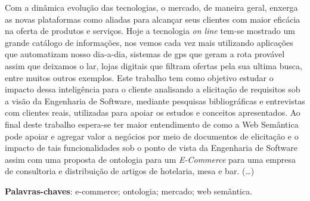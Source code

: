 \begin{resumo}

Com a dinâmica evolução das tecnologias, o mercado, de maneira geral,
 enxerga as novas plataformas como aliadas para alcançar seus clientes com maior
 eficácia na oferta de produtos e serviços. Hoje a tecnologia \textit{on line}
 tem-se mostrado um grande catálogo de informações, nos vemos cada vez
 mais utilizando aplicações que automatizam nosso dia-a-dia, sistemas de gps
 que geram a rota provável assim que deixamos o lar, lojas digitais que filtram
 ofertas pela sua ultima busca, entre muitos outros exemplos. Este trabalho tem
 como objetivo estudar o impacto dessa inteligência para o cliente
 analisando a elicitação de requisitos sob a visão da Engenharia de 
 Software, mediante pesquisas  bibliográficas e entrevistas com clientes  reais, utilizadas para apoiar
 os estudos e conceitos apresentados. Ao final deste trabalho espera-se ter maior
 entendimento de como a Web Semântica pode apoiar e agregar valor a negócios 
 por meio de documentos de elicitação e o impacto de tais funcionalidades sob o ponto de vista
 da Engenharia de Software assim com uma proposta de ontologia para
 um \textit{E-Commerce} para uma empresa de consultoria e distribuição de artigos de hotelaria, mesa e bar. (\dots)

 \vspace{\onelineskip}
    
 \noindent
 \textbf{Palavras-chaves}: e-commerce; ontologia; mercado; web semântica.
\end{resumo}
